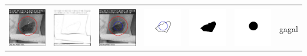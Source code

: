 \begin{table}[H]
\begin{tabular}{|m{0.7in}|m{0.7in}|m{0.7in}|m{0.7in}|m{0.7in}|m{0.7in}|m{0.7in}|}
		&  &  & & & &  \\
		\includegraphics[width=0.7in]{dataset/dataset_3/luka_merah/ready/42_integer_init.jpg}&
		\includegraphics[width=0.7in]{dataset/dataset_3/luka_merah/ready/42_integer_ext.jpg}&
		\includegraphics[width=0.7in]{dataset/dataset_3/luka_merah/ready/42_integer_result.jpg}&
		\includegraphics[width=0.7in]{dataset/dataset_3/luka_merah/ready/42_gt_r_integer.jpg}&
		\includegraphics[width=0.7in]{dataset/dataset_3/luka_merah/ready/42_r.jpg}&
		\includegraphics[width=0.7in]{dataset/dataset_3/luka_merah/ready/42_integer_r.jpg}&
		gagal\\
		\hline
		

\end{tabular}
\end{table}
